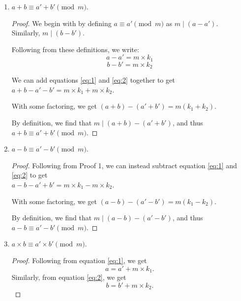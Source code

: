 \documentclass{article}
\theoremstyle{definition}
\begin{document}
\begin{enumerate}
    \item {
        \(a + b \equiv a' + b' \pmod{m}\).

        \begin{proof}
            We begin with by defining \(a \equiv a' \pmod{m}\) as \(m \mid (a - a')\).
            Similarly, \(m \mid (b - b')\).

            Following from these definitions, we write:
            \begin{equation} \label{eq:1}
                a - a' = m \times k_1
            \end{equation}
            \begin{equation} \label{eq:2}
                b - b' = m \times k_2
            \end{equation}

            We can add equations \ref{eq:1} and \ref{eq:2} together to get 
            \(a + b - a' - b' = m \times k_1 + m \times k_2\).

            With some factoring, we get \((a + b) - (a' + b') = m (k_1 + k_2)\).

            By definition, we find that \(m \mid (a + b) - (a' + b')\), and thus
            \(a + b \equiv a' + b' \pmod{m}\).
        \end{proof}
    }

    \item {
        \(a - b \equiv a' - b' \pmod{m}\).

        \begin{proof}
            Following from Proof 1, we can instead subtract equation \ref{eq:1}
            and \ref{eq:2} to get 
            \\ \(a - b - a' + b' = m \times k_1 - m \times k_2\).

            With some factoring, we get \((a-b) - (a'-b') = m(k_1 - k_2)\).

            By definition, we find that \(m \mid (a - b) - (a' - b')\), and thus
            \(a - b \equiv a' - b' \pmod{m}\).
        \end{proof}
    }

    \item {
        \(a \times b \equiv a' \times b' \pmod{m}\).

        \begin{proof}
            Following from equation \ref{eq:1}, we get 
            \begin{equation} \label{eq:3}
                a = a' + m \times k_1.
            \end{equation}
            Similarly, from equation \ref{eq:2}, we  get 
            \begin{equation} \label{eq:4}
                b = b' + m \times k_2.
            \end{equation}


\end{proof}}
\end{enumerate}
\end{document}
